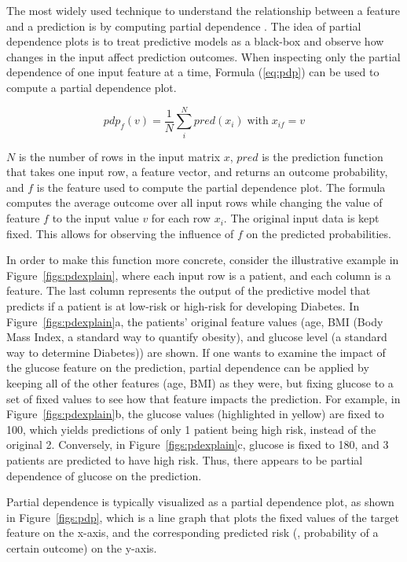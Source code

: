 


The most widely used technique to understand the relationship between a feature and a prediction is by computing partial dependence \cite{friedman2001,hastie2001}.
The idea of partial dependence plots is to treat predictive models as a black-box and observe how changes in the input affect prediction outcomes.
When inspecting only the partial dependence of one input feature at a time, Formula (\ref{eq:pdp}) can be used to compute a partial dependence plot.

\begin{equation}
pdp_f(v) = \frac{1}{N} \sum_i^N pred(x_i) \;\text{with}\; x_{if} = v
\label{eq:pdp}
\end{equation}

$N$ is the number of rows in the input matrix $x$,
$pred$ is the prediction function that takes one input row, a feature vector, and returns an outcome probability,
and $f$ is the feature used to compute the partial dependence plot.
The formula computes the average outcome over all input rows while changing the value of feature $f$ to the
input value $v$ for each row $x_i$. The original input data is kept fixed. This allows for observing the influence of $f$
on the predicted probabilities.

In order to make this function more concrete, consider the illustrative example in Figure~\ref{figs:pdexplain}, where each input row is a patient, and each column is a feature.  The last column represents the output of the predictive model that predicts if a patient is at low-risk or high-risk for developing Diabetes.  In Figure~\ref{figs:pdexplain}a, the patients' original feature values (age, BMI (Body Mass Index, a standard way to quantify obesity), and glucose level (a standard way to determine Diabetes)) are shown.  If one wants to examine the impact of the glucose feature on the prediction, partial dependence can be applied by keeping all of the other features (age, BMI) as they were, but fixing glucose to a set of fixed values to see how that feature impacts the prediction.  For example, in Figure~\ref{figs:pdexplain}b, the glucose values (highlighted in yellow) are fixed to 100, which yields predictions of only 1 patient being high risk, instead of the original 2.  Conversely, in Figure~\ref{figs:pdexplain}c, glucose is fixed to 180, and 3 patients are predicted to have high risk.  Thus, there appears to be partial dependence of glucose on the prediction.  

Partial dependence is typically visualized as a partial dependence plot, as shown in Figure~\ref{figs:pdp}, which is a line graph that plots the fixed values of the target feature on the x-axis, and the corresponding predicted risk (\ie, probability of a certain outcome) on the y-axis.  
